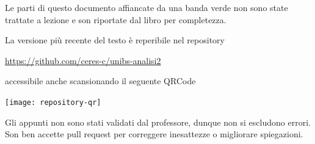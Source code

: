 \documentclass[a4paper,twoside,italian,11pt]{book}
\begin{document}
\cbstart
Le parti di questo documento affiancate da una banda verde non sono state trattate a lezione e son riportate dal libro per completezza.
\cbend

\vfill
\noindent La versione più recente del testo è reperibile nel repository
\begin{center}
	\url{https://github.com/ceres-c/unibs-analisi2}
\end{center}
accessibile anche scansionando il seguente QRCode
\begin{center}
	\texttt{[image: repository-qr]}
\end{center}
Gli appunti non sono stati validati dal professore, dunque non si escludono errori. Son ben accette pull request per correggere inesattezze o migliorare spiegazioni.










\backmatter
\end{document}
